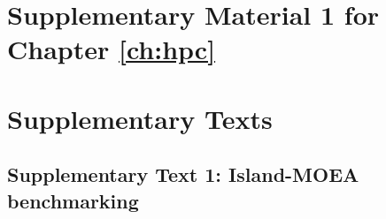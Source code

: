
\renewcommand{\hbAppendixPrefix}{D}

\renewcommand{\thefigure}{\hbAppendixPrefix\arabic{figure}}
\setcounter{figure}{0}
\renewcommand{\thetable}{\hbAppendixPrefix\arabic{table}}
\setcounter{table}{0}
\renewcommand{\theequation}{\hbAppendixPrefix\arabic{equation}}
\setcounter{equation}{0}

\section{Supplementary Material 1 for Chapter \ref{ch:hpc}} \label{apx:sm1-hpc}




\section*{Supplementary Texts}

\subsection*{Supplementary Text 1: Island-MOEA benchmarking} %

